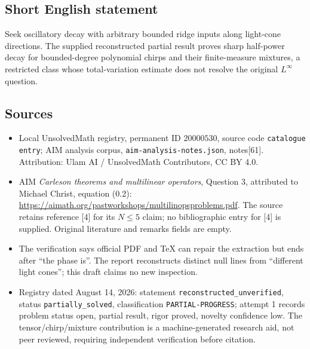 \documentclass[11pt]{article}
\begin{document}
\subsection{Short English statement}
Seek oscillatory decay with arbitrary bounded ridge inputs along light-cone directions. The supplied reconstructed partial result proves sharp half-power decay for bounded-degree polynomial chirps and their finite-measure mixtures, a restricted class whose total-variation estimate does not resolve the original \(L^\infty\) question.
\subsection{Sources}
\begin{itemize}
\item Local UnsolvedMath registry, permanent ID \(20000530\), source code \texttt{catalogue entry}; AIM analysis corpus, \texttt{aim-analysis-notes.json}, notes[61]. Attribution: Ulam AI / UnsolvedMath Contributors, CC BY 4.0.
\item AIM \emph{Carleson theorems and multilinear operators}, Question 3, attributed to Michael Christ, equation (0.2): \url{https://aimath.org/pastworkshops/multilinopsproblems.pdf}. The source retains reference [4] for its \(N\le5\) claim; no bibliographic entry for [4] is supplied. Original literature and remarks fields are empty.
\item The verification says official PDF and TeX can repair the extraction but ends after ``the phase is''. The report reconstructs distinct null lines from ``different light cones''; this draft claims no new inspection.
\item Registry dated August 14, 2026: statement \texttt{reconstructed\_unverified}, status \texttt{partially\_solved}, classification \texttt{PARTIAL-PROGRESS}; attempt 1 records problem status open, partial result, rigor proved, novelty confidence low. The tensor/chirp/mixture contribution is a machine-generated research aid, not peer reviewed, requiring independent verification before citation.
\end{itemize}
\end{document}

